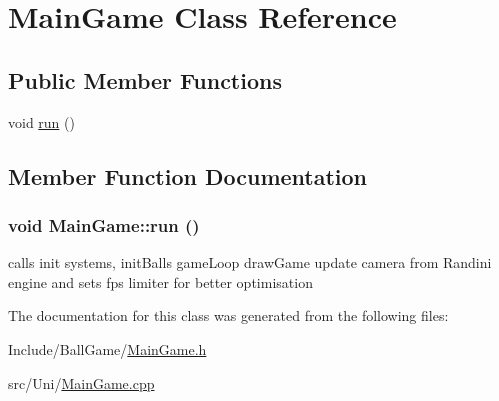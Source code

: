 \hypertarget{classMainGame}{
\section{MainGame Class Reference}
\label{classMainGame}
}
\subsection*{Public Member Functions}
\begin{DoxyCompactItemize}
\item 
void \hyperlink{classMainGame_adacd3f33a9f5e53f33f967d0d66f4d58}{run} ()
\end{DoxyCompactItemize}


\subsection{Member Function Documentation}
\hypertarget{classMainGame_adacd3f33a9f5e53f33f967d0d66f4d58}{
\subsubsection[{run}]{\setlength{\rightskip}{0pt plus 5cm}void MainGame::run ()}}
\label{classMainGame_adacd3f33a9f5e53f33f967d0d66f4d58}
calls init systems, initBalls gameLoop drawGame update camera from Randini engine and sets fps limiter for better optimisation 

The documentation for this class was generated from the following files:\begin{DoxyCompactItemize}
\item 
Include/BallGame/\hyperlink{MainGame_8h}{MainGame.h}\item 
src/Uni/\hyperlink{MainGame_8cpp}{MainGame.cpp}\end{DoxyCompactItemize}
